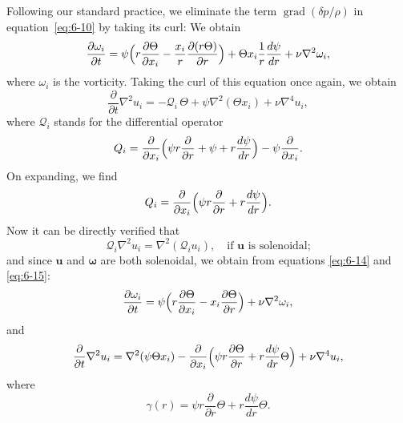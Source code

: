 Following our standard practice, we eliminate the term $\operatorname{grad}(\delta p/\rho)$
in equation~\eqref{eq:6-10} by taking its curl: We obtain
\begin{equation}\label{eq:6-14}
\frac{\partial \omega_i}{\partial t} = \psi\Bigl(r\frac{\partial \Theta}{\partial x_i} - \frac{x_i}{r}\frac{\partial(r\Theta)}{\partial r}\Bigr) + \Theta x_i\frac{1}{r}\frac{d\psi}{dr} + \nu\nabla^2\omega_i,
\end{equation}
where $\omega_i$ is the vorticity. Taking the curl of this equation once again,
we obtain
\begin{equation}\label{eq:6-15}
\frac{\partial}{\partial t}\nabla^2 u_i = -\mathscr{Q}_i\,\Theta + \psi\nabla^2(\Theta x_i) + \nu\nabla^4 u_i,
\end{equation}
where $\mathscr{Q}_i$ stands for the differential operator
\begin{equation}\label{eq:6-16}
\mathscr{Q}_i = \frac{\partial}{\partial x_i}\Bigl(\psi r\frac{\partial}{\partial r} + \psi + r\frac{d\psi}{dr}\Bigr) - \psi\frac{\partial}{\partial x_i}.
\end{equation}
On expanding, we find
\begin{equation}\label{eq:6-17}
\mathscr{Q}_i = \frac{\partial}{\partial x_i}\Bigl(\psi r\frac{\partial}{\partial r} + r\frac{d\psi}{dr}\Bigr).
\end{equation}
Now it can be directly verified that
\begin{equation}\label{eq:6-18}
\mathscr{Q}_i\nabla^2 u_i = \nabla^2(\mathscr{Q}_i u_i),\quad\text{if } \boldsymbol{u} \text{ is solenoidal;}
\end{equation}
and since $\boldsymbol{u}$ and $\boldsymbol{\omega}$ are both solenoidal, we obtain from equations
\eqref{eq:6-14} and \eqref{eq:6-15}:
\begin{equation}\label{eq:6-19}
\frac{\partial \omega_i}{\partial t} = \psi\Bigl(r\frac{\partial \Theta}{\partial x_i} - x_i\frac{\partial \Theta}{\partial r}\Bigr) + \nu\nabla^2\omega_i,
\end{equation}
and
\begin{equation}\label{eq:6-20}
\frac{\partial}{\partial t}\nabla^2 u_i = \nabla^2(\psi\Theta x_i) - \frac{\partial}{\partial x_i}\Bigl(\psi r\frac{\partial \Theta}{\partial r} + r\frac{d\psi}{dr}\Theta\Bigr) + \nu\nabla^4 u_i,
\end{equation}
where
\begin{equation}\label{eq:6-21}
\gamma(r) = \psi r\frac{\partial}{\partial r}\Theta + r\frac{d\psi}{dr}\Theta.
\end{equation}

